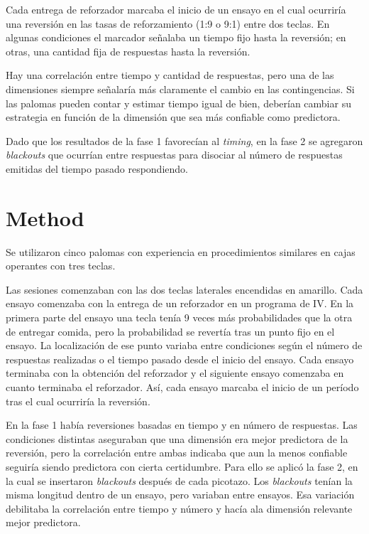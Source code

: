 \documentclass[a4paper,12pt]{article}
\begin{document}
Cada entrega de reforzador marcaba el inicio de un ensayo en el cual ocurriría una reversión en las tasas de reforzamiento (1:9 o 9:1) entre dos teclas. En algunas condiciones el marcador señalaba un tiempo fijo hasta la reversión; en otras, una cantidad fija de respuestas hasta la reversión.

Hay una correlación entre tiempo y cantidad de respuestas, pero una de las dimensiones siempre señalaría más claramente el cambio en las contingencias. Si las palomas pueden contar y estimar tiempo igual de bien, deberían cambiar su estrategia en función de la dimensión que sea más confiable como predictora.

Dado que los resultados de la fase 1 favorecían al {\itshape timing}, en la fase 2 se agregaron {\itshape blackouts} que ocurrían entre respuestas para disociar al número de respuestas emitidas del tiempo pasado respondiendo.

\section{Method}

Se utilizaron cinco palomas con experiencia en procedimientos similares en cajas operantes con tres teclas.

Las sesiones comenzaban con las dos teclas laterales encendidas en amarillo. Cada ensayo comenzaba con la entrega de un reforzador en un programa de IV. En la primera parte del ensayo una tecla tenía 9 veces más probabilidades que la otra de entregar comida, pero la probabilidad se revertía tras un punto fijo en el ensayo. La localización de ese punto variaba entre condiciones según el número de respuestas realizadas o el tiempo pasado desde el inicio del ensayo. Cada ensayo terminaba con la obtención del reforzador y el siguiente ensayo comenzaba en cuanto terminaba el reforzador. Así, cada ensayo marcaba el inicio de un período tras el cual ocurriría la reversión.

En la fase 1 había reversiones basadas en tiempo y en número de respuestas. Las condiciones distintas aseguraban que una dimensión era mejor predictora de la reversión, pero la correlación entre ambas indicaba que aun la menos confiable seguiría siendo predictora con cierta certidumbre. Para ello se aplicó la fase 2, en la cual se insertaron {\itshape blackouts} después de cada picotazo. Los {\itshape blackouts} tenían la misma longitud dentro de un ensayo, pero variaban entre ensayos. Esa variación debilitaba la correlación entre tiempo y número y hacía ala dimensión relevante mejor predictora.
\end{document}

